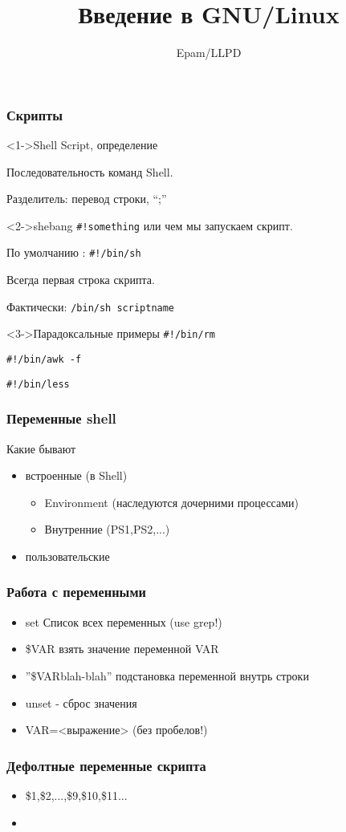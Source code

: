 \documentclass[ignorenonframetext, professionalfonts, hyperref={pdftex, unicode}]{beamer}
\title{Введение в GNU/Linux}
\author{Epam/LLPD}
\begin{document}

\begin{frame}[fragile]
  \frametitle{Скрипты}
 
  \begin{block}<1->{Shell Script, определение}  

    Последовательность команд Shell.

    Разделитель: перевод строки, ``;''
  \end{block}

  \begin{block}<2->{shebang}
    \verb+#!something+ или чем мы запускаем скрипт. 
    
    По умолчанию : \verb+#!/bin/sh+
  
    Всегда первая строка скрипта.

    Фактически: \verb+/bin/sh scriptname+
  \end{block}

  \begin{block}<3->{Парадоксальные примеры}
    \verb+#!/bin/rm+

    \verb+#!/bin/awk -f+

    \verb+#!/bin/less+
  \end{block}

\end{frame}
\begin{frame}[fragile]
  \frametitle{Переменные shell}
  Какие бывают
  \begin{itemize}
    \item встроенные (в Shell)
      \begin{itemize}
        \item Environment (наследуются дочерними процессами)
      \item Внутренние (PS1,PS2,...)
      \end{itemize}
    \item пользовательские 
  \end{itemize} 
\end{frame}
\begin{frame}[fragile]
  \frametitle{Работа с переменными}
  \begin{itemize}
    \item \alert{set} Список всех переменных (use grep!)
    \item \alert{\$VAR} взять значение переменной VAR
    \item \alert{''\${VAR}blah-blah''} подстановка переменной внутрь строки
    \item \alert{unset} - сброс значения 
    \item \alert{VAR=<выражение>} (без пробелов!)
   \end{itemize}
 \end{frame}
\begin{frame}[fragile]
  \frametitle{Дефолтные переменные скрипта}
  \begin{itemize}
    \item \alert{\$1,\$2,...,\$9,\${10},\${11}...}
    \item 
  \end{itemize}
\end{frame}
\end{document}

